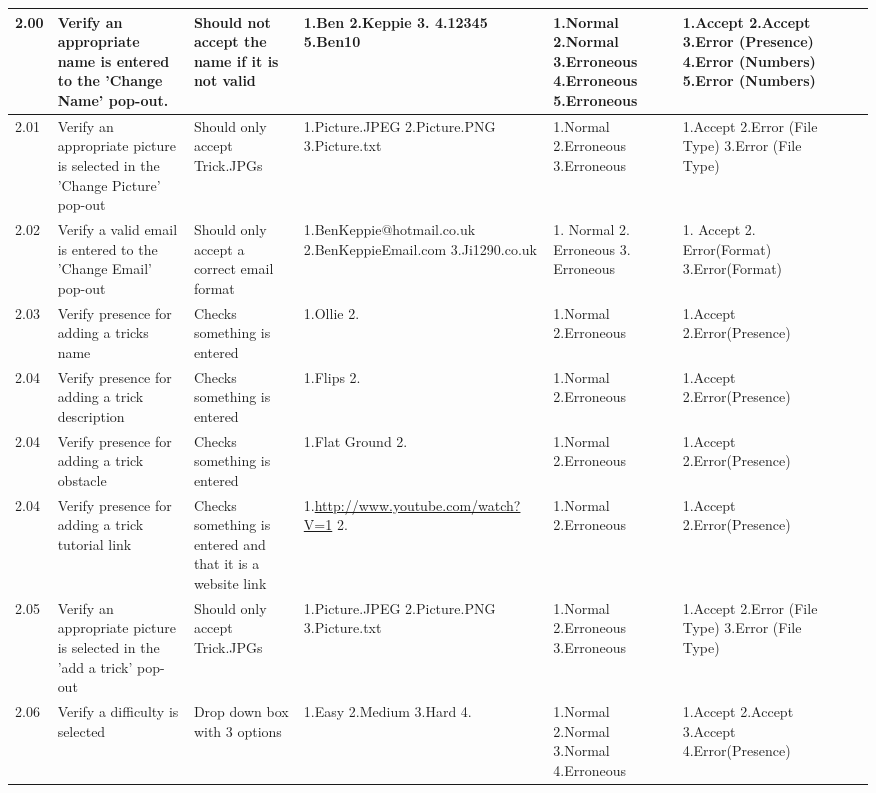 \begin{landscape}
\begin{center}
\begin{longtable}{|p{1.5cm}|p{2.5cm}|p{2.5cm}|p{2cm}|p{2cm}|p{2cm}|p{2cm}|p{2cm}|}
2.00 & Verify an appropriate name is entered to the 'Change Name' pop-out. & Should not accept the name if it is not valid & 1.Ben 2.Keppie 3.   4.12345  5.Ben10 & 1.Normal 2.Normal 3.Erroneous 4.Erroneous 5.Erroneous & 1.Accept 2.Accept 3.Error (Presence) 4.Error (Numbers) 5.Error (Numbers) & & \\ \hline

2.01 & Verify an appropriate picture is selected in the 'Change Picture' pop-out & Should only accept Trick.JPGs & 1.Picture.JPEG 2.Picture.PNG 3.Picture.txt & 1.Normal 2.Erroneous 3.Erroneous & 1.Accept 2.Error (File Type) 3.Error (File Type) & & \\ \hline

2.02 & Verify a valid email is entered to the 'Change Email' pop-out & Should only accept a correct email format & 1.BenKeppie@hotmail.co.uk 2.BenKeppieEmail.com 3.Ji1290.co.uk & 1. Normal 2. Erroneous 3. Erroneous & 1. Accept 2. Error(Format) 3.Error(Format) & & \\ \hline

2.03 & Verify presence for adding a tricks name & Checks something is entered & 1.Ollie 2.  & 1.Normal 2.Erroneous & 1.Accept 2.Error(Presence) & & \\ \hline

2.04 & Verify presence for adding a trick description & Checks something is entered & 1.Flips 2. & 1.Normal 2.Erroneous & 1.Accept 2.Error(Presence) & & \\ \hline

2.04 & Verify presence for adding a trick obstacle & Checks something is entered & 1.Flat Ground 2. & 1.Normal 2.Erroneous & 1.Accept 2.Error(Presence) & & \\ \hline

2.04 & Verify presence for adding a trick tutorial link & Checks something is entered and that it is a website link & 1.\url{http://www.youtube.com/watch?V=1} 2. & 1.Normal 2.Erroneous & 1.Accept 2.Error(Presence) & & \\ \hline

2.05 & Verify an appropriate picture is selected in the 'add a trick' pop-out & Should only accept Trick.JPGs & 1.Picture.JPEG 2.Picture.PNG 3.Picture.txt & 1.Normal 2.Erroneous 3.Erroneous & 1.Accept 2.Error (File Type) 3.Error (File Type) & & \\ \hline

2.06 & Verify a difficulty is selected & Drop down box with 3 options & 1.Easy 2.Medium 3.Hard 4. & 1.Normal 2.Normal 3.Normal 4.Erroneous & 1.Accept 2.Accept 3.Accept 4.Error(Presence) & & \\ \hline


\end{longtable}
\end{center}
\end{landscape}

